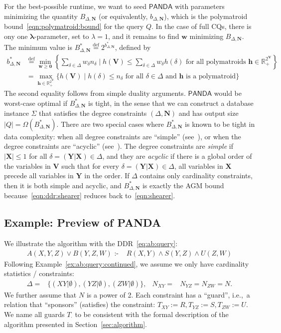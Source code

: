 \documentclass[10pt,a4paper]{article}
\newcommand{\set}[1]{\{#1\}}                    %
\newcommand{\defeq}{\stackrel{\text{def}}{=}}
\newcommand{\R}{\mathbb R} %
\newcommand{\cd}{\text{ :- }}
\newcommand{\agm}{\textsf{AGM}\xspace}
\newcommand{\panda}{\textsf{PANDA}\xspace}
\begin{document}
For the best-possible runtime, we want to seed $\panda$ with parameters minimizing the quantity $B_{\Delta,\bm N}$
(or equivalently, $b_{\Delta,\bm N}$),
which is the polymatroid bound~\eqref{eqn:polymatroid:bound} for the query $Q$.
In the case of full CQs, there is ony one $\bm \lambda$-parameter, set to $\lambda=1$, and it remains to find
$\bm w$ minimizing $B_{\Delta,\bm N}$. The minimum value is
$B^*_{\Delta, \bm N} \defeq 2^{b^*_{\Delta,\bm N}}$, defined by
\begin{align*}
b^*_{\Delta,\bm N} &\defeq \min_{\bm w \geq \bm 0} \left\{
  \sum_{\delta \in \Delta} w_\delta n_\delta
  \mid
  h(\bm V) \leq \sum_{\delta \in \Delta} w_\delta h(\delta) \text{ for all polymatroids } \bm h \in \R_+^{2^{\bm V}}
  \right\} \\
  &= \max_{\bm h \in \R_+^{2^{\bm V}}} \biggl\{
      h(\bm V) \mid h(\delta) \leq n_\delta \text{ for all } \delta \in \Delta
     \text{ and } \bm h \text{ is a polymatroid}
    \biggr\}
\end{align*}
The second equality follows from simple duality arguments.
$\panda$ would be worst-case optimal if
$B^*_{\Delta,\bm N}$ is tight, in the sense that we can construct a database instance
$\Sigma$ that satisfies the degree constraints $(\Delta,\bm N)$ and has output size $|Q| =
\Omega(B^*_{\Delta,\bm N})$. There are two special cases where $B^*_{\Delta,\bm N}$ is known
to be tight in data complexity: when all degree constraints are ``simple''
(see~\cite{DBLP:journals/tods/KhamisKNS21, 10175769}), or when the degree constraints are
``acyclic'' (see~\cite{DBLP:conf/pods/KhamisNS16,10.1145/3196959.3196990}). The degree
constraints are {\em simple} if $|\bm X| \leq 1$ for all $\delta = (\bm Y|\bm X) \in \Delta$, and
they are {\em acyclic} if there is a global order of the variables in $\bm V$ such that for every
$\delta = (\bm Y|\bm X) \in \Delta$, all variables in $\bm X$ precede all variables in $\bm
Y$ in the order.
If $\Delta$ contains only cardinality constraints, then it is both simple and acyclic,
and $B^*_{\Delta,\bm N}$ is exactly the \agm bound because~\eqref{eqn:ddr:shearer} reduces back to~\eqref{eqn:shearer}.

\subsection{Example: Preview of  \panda}
\label{subsec:example2}


We illustrate the algorithm with the DDR~\eqref{eq:ab:query}:
\begin{align*}
  A(X,Y,Z) \vee B(Y,Z,W) \cd & R(X,Y) \wedge S(Y,Z) \wedge U(Z,W)
\end{align*}
%
Following Example~\ref{ex:ab:query:continued}, we assume we only have cardinality statistics / constraints:
\begin{align*}
  \Delta = & \set{(XY|\emptyset), (YZ|\emptyset), (ZW|\emptyset)}, & N_{XY}=&N_{YZ}=N_{ZW}=N.
\end{align*}
%
We further assume that $N$ is a power of 2.
Each constraint has a ``guard'', i.e.,~a relation that ``sponsors'' (satisfies)
the constraint:
$T_{XY}:=R, T_{YZ}:=S, T_{ZW}:=U$. We name all guards $T_{\cdot}$ to be consistent with the
formal description of the algorithm presented in Section~\ref{sec:algorithm}.
\end{document}
